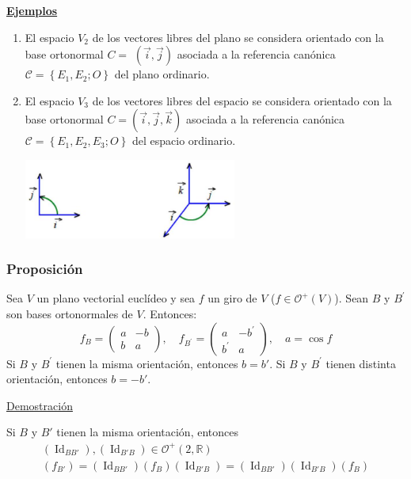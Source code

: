 \documentclass[12pt, a4paper, ones, notitlepage, openany,titlepage]{article}
\newcommand{\demostracion}{\noindent\underline{Demostración}}
\newcommand{\ejemplos}{\noindent\underline{\textbf{Ejemplos}}}
\begin{document}
\ejemplos
\begin{enumerate}[label=(\arabic*)]
	\item El espacio $V_{2}$ de los vectores libres del plano se considera orientado con la base ortonormal $C=$ $(\vec{i}, \vec{j})$ asociada a la referencia canónica $\mathcal{C}=\left\{E_{1}, E_{2} ; O\right\}$ del plano ordinario.
	
	\item El espacio $V_{3}$ de los vectores libres del espacio se considera orientado con la base ortonormal $C=(\vec{i}, \vec{j}, \vec{k})$ asociada a la referencia canónica $\mathcal{C}=\left\{E_{1}, E_{2}, E_{3} ; O\right\}$ del espacio ordinario.
	
	\includegraphics[max width=7cm, center]{2023_03_20_c2fe6c117849a1a0e8afg-057}
\end{enumerate}

\subsubsection{Proposición}
Sea $V$ un plano vectorial euclídeo y sea $f$ un giro de $V$ ($f \in \mathcal{O}^+(V)$). Sean $B$ y $B^{\prime}$ son bases ortonormales de $V$. Entonces:
$$
f_{B}=\left(\begin{array}{rr}
	a & -b \\
	b & a
\end{array}\right), \quad f_{B^{\prime}}=\left(\begin{array}{rr}
	a & -b^{\prime} \\
	b^{\prime} & a
\end{array}\right), \quad a = \operatorname{cos}f
$$
Si $B$ y $B^{\prime}$ tienen la misma orientación, entonces $b = b'$. Si $B$ y $B^{\prime}$ tienen distinta orientación, entonces $b = -b'$.

\demostracion

Si $B$ y $B'$ tienen la misma orientación, entonces
\begin{gather*}
	(\operatorname{Id}_{BB'}),(\operatorname{Id}_{B'B}) \in \mathcal{O}^+(2,\mathbb{R}) \\
	(f_{B'}) = (\operatorname{Id}_{BB'})(f_{B})(\operatorname{Id}_{B'B})
	= (\operatorname{Id}_{BB'})(\operatorname{Id}_{B'B})(f_B)
\end{gather*}
\end{document}
